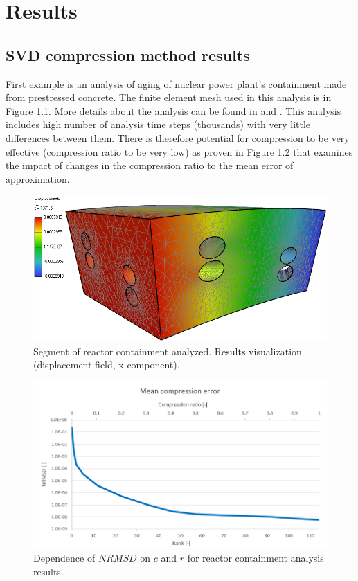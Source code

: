 \chapter{Results}

\section{SVD compression method results}

First example is an analysis of aging of nuclear power plant's containment made from prestressed concrete. The finite element mesh used in this analysis is in Figure \ref{fig:temelin:mesh}. More details about the analysis can be found in \cite{Kruis2012} and \cite{Koudelka2009}. This analysis includes high number of analysis time steps (thousands) with very little differences between them. There is therefore potential for compression to be very effective (compression ratio to be very low) as proven in Figure \ref{fig:temelin:NRMSD} that examines the impact of changes in the compression ratio to the mean error of approximation.

\begin{figure}[H]
\centering
\includegraphics[width=\textwidth]{figures/chapter-SVD/temelin_screenshot}
\decoRule
\caption[Results visualization: reactor containment 3D.]{Segment of reactor containment analyzed. Results visualization (displacement field, x component).}
\label{fig:temelin:mesh}
\end{figure}

\begin{figure}[H]
\centering
\includegraphics[width=\textwidth]{figures/chapter-SVD/temelin_NRMSD}
\decoRule
\caption[Dependence of NRMSD on compression ratio and rank (reactor containment 3D).]{Dependence of $\mathit{NRMSD}$ on $c$ and $r$ for reactor containment analysis results.} %
\label{fig:temelin:NRMSD}
\end{figure}

